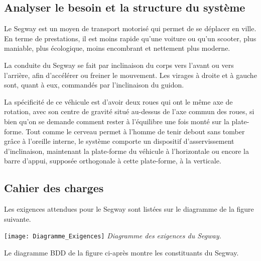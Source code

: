\begin{multicols}{2}

\section*{Analyser le besoin et la structure du système\\}


Le Segway\textregistered{} est un moyen de transport motorisé qui permet de se déplacer en ville. En terme de prestations,
il est moins rapide qu'une voiture ou qu'un scooter, plus maniable, plus écologique, moins encombrant
et nettement plus moderne.

La conduite du Segway\textregistered{} se fait par inclinaison du corps vers l'avant ou vers l'arrière, afin d'accélérer
ou freiner le mouvement. Les virages à droite et à gauche sont, quant à eux, commandés par l'inclinaison
du guidon.

La spécificité de ce véhicule est d'avoir deux roues qui ont le même axe de rotation, avec son centre
de gravité situé au-dessus de l'axe commun des roues, si bien qu'on se demande comment rester à
l'équilibre une fois monté sur la plate-forme. Tout comme le cerveau permet à l'homme de tenir debout
sans tomber grâce à l'oreille interne, le système comporte un dispositif d'asservissement d'inclinaison,
maintenant la plate-forme du véhicule à l'horizontale ou encore la barre d'appui, supposée orthogonale
à cette plate-forme, à la verticale.

\normalsize

\subsection*{ Cahier des charges} Les exigences attendues pour le Segway\textregistered{} sont listées sur le diagramme de la figure suivante.%

\begin{center}%

\texttt{[image: Diagramme\_Exigences]}
\textit{Diagramme des exigences du Segway\textregistered.}
\label{ex_Segway_exigences}
\end{center}%



Le diagramme BDD de la figure ci-après montre les constituants du Segway\textregistered.



\end{multicols}
